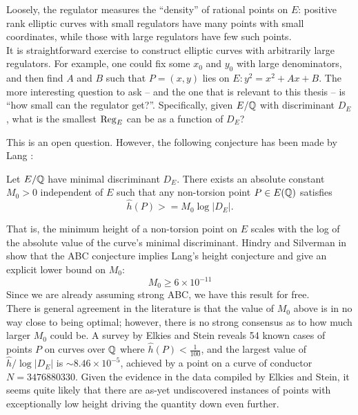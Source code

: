 \documentclass[10pt]{article}
\begin{document}
Loosely, the regulator measures the ``density'' of rational points on $E$: positive rank elliptic curves with small regulators have many points with small coordinates, while those with large regulators have few such points.\\

It is straightforward exercise to construct elliptic curves with arbitrarily large regulators. For example, one could fix some $x_0$ and $y_0$ with large denominators, and then find $A$ and $B$ such that $P=(x,y)$ lies on $E: y^2 = x^2 + Ax + B$. The more interesting question to ask -- and the one that is relevant to this thesis -- is ``how small can the regulator get?''. Specifically, given $E/\mathbb{Q}$ with discriminant $D_E$, what is the smallest $\operatorname{Reg}_E$ can be as a function of $D_E$?

This is an open question. However, the following conjecture has been made by Lang \cite{Lang-1997}:

\begin{conjecture}\label{conj:Lang_height}
Let $E/\mathbb{Q}$ have minimal discriminant $D_E$. There exists an absolute constant $M_0 >0$ independent of $E$ such that any non-torsion point $P \in E(\mathbb{Q})$ satisfies
\begin{equation}
\hat{h}(P) >= M_0 \log |D_E| .
\end{equation}
\end{conjecture}
That is, the minimum height of a non-torsion point on $E$ scales with the log of the absolute value of the curve's minimal discriminant. Hindry and Silverman in \cite{HiS-1988} show that the ABC conjecture implies Lang's height conjecture and give an explicit lower bound on $M_0$:
\begin{equation}
M_0 \ge 6\times 10^{-11}
\end{equation}
Since we are already assuming strong ABC, we have this result for free. \\

There is general agreement in the literature is that the value of $M_0$ above is in no way close to being optimal; however, there is no strong consensus as to how much larger $M_0$ could be. A survey by Elkies and Stein \cite{ElSt-2002} reveals 54 known cases of points $P$ on curves over $\mathbb{Q}$ where $\hat{h}(P) < \frac{1}{100}$, and the largest value of $\hat{h}/\log|D_E|$ is $\sim 8.46 \times 10^{-5}$, achieved by a point on a curve of conductor $N=3476880330$. Given the evidence in the data compiled by Elkies and Stein, it seems quite likely that there are as-yet undiscovered instances of points with exceptionally low height driving the quantity down even further. \\
\end{document}
